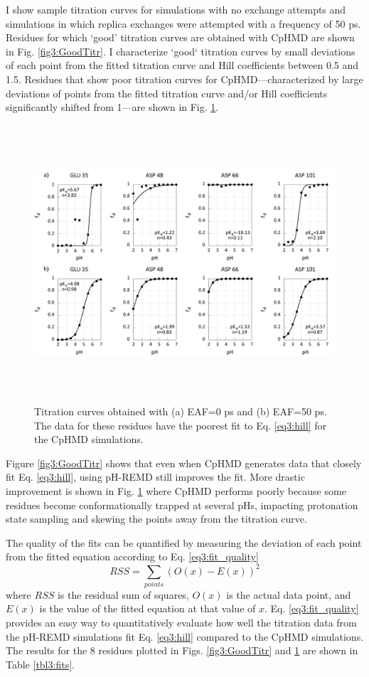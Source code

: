 I show sample titration curves for simulations with no exchange attempts and
simulations in which replica exchanges were attempted with a frequency of 50
ps.  Residues for which `good' titration curves are obtained with
CpHMD are shown in Fig. \ref{fig3:GoodTitr}.  I characterize `good` titration
curves by small deviations of each point from the fitted titration curve and
Hill coefficients between 0.5 and 1.5. Residues that show poor titration curves
for CpHMD---characterized by large deviations of points from the fitted
titration curve and/or Hill coefficients significantly shifted from 1---are
shown in Fig. \ref{fig3:BadTitr}.

\begin{figure}
 \includegraphics[width=6.5in, height=4.06in]{Comparison_bad_curves.png}
 \caption{Titration curves obtained with (a) EAF=0 ps and (b) EAF=50
          ps. The data for these residues have the poorest fit to Eq.
          \ref{eq3:hill} for the CpHMD simulations.}
 \label{fig3:BadTitr}
\end{figure}

Figure \ref{fig3:GoodTitr} shows that even when CpHMD generates data that
closely fit Eq.  \ref{eq3:hill}, using pH-REMD still improves the fit. More
drastic improvement is shown in Fig. \ref{fig3:BadTitr} where CpHMD performs
poorly because some residues become conformationally trapped at several pHs,
impacting protonation state sampling and skewing the points away from the
titration curve.

The quality of the fits can be quantified by measuring the deviation of each
point from the fitted equation according to Eq. \ref{eq3:fit_quality}
\begin{equation}
 RSS = \sum_{points} \left( O(x) - E(x) \right) ^ 2
 \label{eq3:fit_quality}
\end{equation}
where $RSS$ is the residual sum of squares, $O(x)$ is the actual data point, and
$E(x)$ is the value of the fitted equation at that value of $x$. Eq.
\ref{eq3:fit_quality} provides an easy way to quantitatively evaluate how well
the titration data from the pH-REMD simulations fit Eq. \ref{eq3:hill} compared
to the CpHMD simulations.  The results for the 8 residues plotted in Figs.
\ref{fig3:GoodTitr} and \ref{fig3:BadTitr} are shown in Table \ref{tbl3:fits}.

